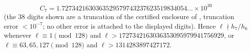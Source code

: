 \[ C_7=1.7273421630363529579743237623519834054\ldots\times10^{30} \]
(the $38$ digits shown are a truncation of the certified enclosure of , truncation error $<10^{-7}$; no other error is attached to the displayed digits). Hence $\ell\nmid h_7/h_6$ whenever $\ell\equiv1\pmod{128}$ and $\ell>1727342163036353095979941756929$, or $\ell\equiv63,65,127\pmod{128}$ and $\ell>1314283897427172$.

